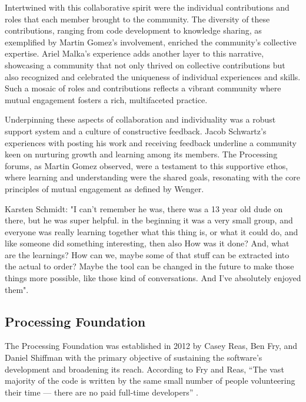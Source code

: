 Intertwined with this collaborative spirit were the individual contributions and roles that each member brought to the community. The diversity of these contributions, ranging from code development to knowledge sharing, as exemplified by Martin Gomez's involvement, enriched the community's collective expertise. Ariel Malka's experience adds another layer to this narrative, showcasing a community that not only thrived on collective contributions but also recognized and celebrated the uniqueness of individual experiences and skills. Such a mosaic of roles and contributions reflects a vibrant community where mutual engagement fosters a rich, multifaceted practice.

Underpinning these aspects of collaboration and individuality was a robust support system and a culture of constructive feedback. Jacob Schwartz's experiences with posting his work and receiving feedback underline a community keen on nurturing growth and learning among its members. The Processing forums, as Martin Gomez observed, were a testament to this supportive ethos, where learning and understanding were the shared goals, resonating with the core principles of mutual engagement as defined by Wenger.

Karsten Schmidt: "I can't remember he was, there was a 13 year old dude on there, but he was super helpful. in the beginning it was a very small group, and everyone was really learning together what this thing is, or what it could do, and like someone did something interesting, then also How was it done? And, what are the learnings? How can we, maybe some of that stuff can be extracted into the actual to order? Maybe the tool can be changed in the future to make those things more possible, like those kind of conversations. And I've absolutely enjoyed them"​​.


\subsection{Processing Foundation}

The Processing Foundation was established in 2012 by Casey Reas, Ben Fry, and Daniel Shiffman with the primary objective of sustaining the software's development and broadening its reach. According to Fry and Reas, ``The vast majority of the code is written by the same small number of people volunteering their time — there are no paid full-time developers'' \parencite[p.~13]{fryModernPrometheusHistory2018}.

